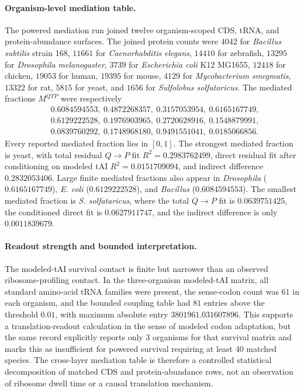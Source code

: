 \paragraph{Organism-level mediation table.}
The powered mediation run joined twelve organism-scoped CDS, tRNA, and protein-abundance surfaces.  The joined protein counts were $4042$ for \emph{Bacillus subtilis} strain 168, $11661$ for \emph{Caenorhabditis elegans}, $14410$ for zebrafish, $13295$ for \emph{Drosophila melanogaster}, $3739$ for \emph{Escherichia coli} K12 MG1655, $12418$ for chicken, $19053$ for human, $19395$ for mouse, $4129$ for \emph{Mycobacterium smegmatis}, $13322$ for rat, $5815$ for yeast, and $1656$ for \emph{Sulfolobus solfataricus}.  The mediated fractions $M^{QTP}$ were respectively
$$
\begin{aligned}
&0.6084594553,\ 0.4872268357,\ 0.3157053954,\ 0.6165167749,\\
&0.6129222528,\ 0.1976903965,\ 0.2720628916,\ 0.1548879991,\\
&0.0839760292,\ 0.1748968180,\ 0.9491551041,\ 0.0185066856.
\end{aligned}
$$
Every reported mediated fraction lies in $[0,1]$.  The strongest mediated fraction is yeast, with total residual $Q\to P$ fit $R^2=0.2983762499$, direct residual fit after conditioning on modeled tAI $R^2=0.0151709094$, and indirect difference $0.2832053406$.  Large finite mediated fractions also appear in \emph{Drosophila} ($0.6165167749$), \emph{E. coli} ($0.6129222528$), and \emph{Bacillus} ($0.6084594553$).  The smallest mediated fraction is \emph{S. solfataricus}, where the total $Q\to P$ fit is $0.0639751425$, the conditioned direct fit is $0.0627911747$, and the indirect difference is only $0.0011839679$.

\paragraph{Readout strength and bounded interpretation.}
The modeled-tAI survival contact is finite but narrower than an observed ribosome-profiling contact.  In the three-organism modeled-tAI matrix, all standard amino-acid tRNA families were present, the sense-codon count was $61$ in each organism, and the bounded coupling table had $81$ entries above the threshold $0.01$, with maximum absolute entry $3801961.031607896$.  This supports a translation-readout calculation in the sense of modeled codon adaptation, but the same record explicitly reports only $3$ organisms for that survival matrix and marks this as insufficient for powered survival requiring at least $40$ matched species.  The cross-layer mediation table is therefore a controlled statistical decomposition of matched CDS and protein-abundance rows, not an observation of ribosome dwell time or a causal translation mechanism.

